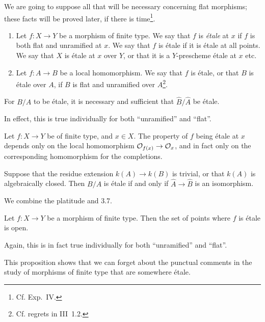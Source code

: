 We are going to suppose all that will be necessary concerning flat morphisms; these facts will be proved later, if there is time\footnote{Cf. Exp.~IV.}.

\begin{defn}
    \begin{enumerate}[\normalfont a)]
        \item Let $f\colon X\to Y$ be a morphism of finite type.
            We say that $f$ is \emph{étale} at $x$ if $f$ is both flat and unramified at $x$.
            We say that $f$ is étale if it is étale at all points.
            We say that $X$ is étale at $x$ over $Y$, or that it is a $Y$-prescheme étale at $x$ etc.
        \item Let $f\colon A\to B$ be a local homomorphism.
            We say that $f$ is étale, or that $B$ is étale over $A$, if $B$ is flat and unramified over $A$\footnote{Cf. regrets in III~1.2.}.
    \end{enumerate}
\end{defn}

\begin{prop}
    For $B/A$ to be étale, it is necessary and sufficient that $\hat{B}/\hat{A}$ be étale.
\end{prop}

In effect, this is true individually for both ``unramified'' and ``flat''.

\begin{cor}
    Let $f\colon X\to Y$ be of finite type, and $x\in X$.
    The property of $f$ being étale at $x$ depends only on the local homomorphism $\mathcal{O}_{f(x)}\to\mathcal{O}_x$, and in fact only on the corresponding homomorphism for the completions.
\end{cor}

\begin{cor}
    Suppose that the residue extension $k(A)\to k(B)$ is trivial, or that $k(A)$ is algebraically closed.
    Then $B/A$ is étale if and only if $\hat{A}\to\hat{B}$ is an isomorphism.
\end{cor}

We combine the platitude and 3.7.

\begin{prop}
    Let $f\colon X\to Y$ be a morphism of finite type.
    Then the set of points where $f$ is étale is open.
\end{prop}
Again, this is in fact true individually for both ``unramified'' and ``flat''.

This proposition shows that we can forget about the punctual comments in the study of morphisms of finite type that are somewhere étale.

